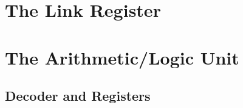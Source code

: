 


\section{The Link Register}



\section{The Arithmetic/Logic Unit}



\subsection{Decoder and Registers}



